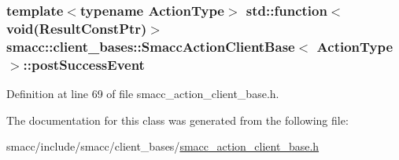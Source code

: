 \subsubsection[{\texorpdfstring{post\+Success\+Event}{postSuccessEvent}}]{\setlength{\rightskip}{0pt plus 5cm}template$<$typename Action\+Type$>$ std\+::function$<$void(Result\+Const\+Ptr)$>$ {\bf smacc\+::client\+\_\+bases\+::\+Smacc\+Action\+Client\+Base}$<$ Action\+Type $>$\+::post\+Success\+Event}\hypertarget{classsmacc_1_1client__bases_1_1SmaccActionClientBase_afb4f82508cd653d496392f321e84a783}{}\label{classsmacc_1_1client__bases_1_1SmaccActionClientBase_afb4f82508cd653d496392f321e84a783}


Definition at line 69 of file smacc\+\_\+action\+\_\+client\+\_\+base.\+h.



The documentation for this class was generated from the following file\+:\begin{DoxyCompactItemize}
\item 
smacc/include/smacc/client\+\_\+bases/\hyperlink{smacc__action__client__base_8h}{smacc\+\_\+action\+\_\+client\+\_\+base.\+h}\end{DoxyCompactItemize}
